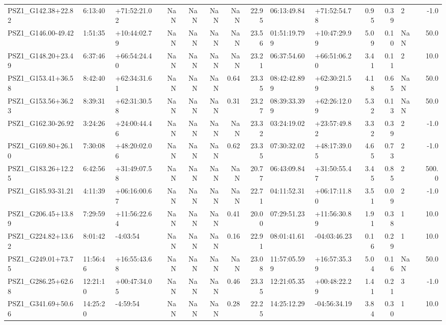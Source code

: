 \documentclass[apj, revtex4]{emulateapj}
\begin{document}
\begin{table}
\begin{tabular}{lllrrrrrllrrlr}
 PSZ1\_G142.38+22.82 &   6:13:40 &  +71:52:21.02 & NaN &  NaN &   NaN & NaN &    22.95 &   06:13:49.84 &  +71:52:54.78 &     0.95 &  0.39 &    2 &  -1.0 \\
 PSZ1\_G146.00-49.42 &   1:51:35 &  +10:44:02.79 & NaN &  NaN &   NaN & NaN &    23.56 &  01:51:19.799 &  +10:47:29.99 &     5.09 &  0.10 &  NaN &  50.0 \\
 PSZ1\_G148.20+23.49 &   6:37:46 &  +66:54:24.40 & NaN &  NaN &   NaN &  NaN &    23.21 &   06:37:54.60 &  +66:51:06.20 &     3.41 &  0.11 &    2 &  10.0 \\
 PSZ1\_G153.41+36.58 &   8:42:40 &  +62:34:31.61 & NaN &  NaN &   NaN & 0.64 &    23.35 &  08:42:42.899 &  +62:30:21.59 &     4.18 &  0.65 &  NaN &  50.0 \\
 PSZ1\_G153.56+36.23 &   8:39:31 &  +62:31:30.58 & NaN &  NaN &   NaN & 0.31 &    23.27 &  08:39:33.399 &  +62:26:12.09 &     5.32 &  0.13 &  NaN &  50.0 \\
 PSZ1\_G162.30-26.92 &   3:24:26 &  +24:00:44.46 & NaN &  NaN &   NaN & NaN &    23.32 &   03:24:19.02 &  +23:57:49.82 &     3.32 &  0.39 &    2 &  -1.0 \\
 PSZ1\_G169.80+26.10 &   7:30:08 &  +48:20:02.06 & NaN &  NaN &   NaN & 0.62 &    23.35 &   07:30:32.02 &  +48:17:39.05 &     4.65 &  0.73 &    2 &  -1.0 \\
 PSZ1\_G183.26+12.25 &   6:42:56 &  +31:49:07.58 & NaN &  NaN &   NaN & NaN &    20.77 &   06:43:09.84 &  +31:50:55.47 &     3.45 &  0.85 &    2 & 500.0 \\
 PSZ1\_G185.93-31.21 &   4:11:39 &  +06:16:00.67 & NaN &  NaN &   NaN & NaN &    22.71 &   04:11:52.31 &  +06:17:11.80 &     3.51 &  0.09 &    2 &  -1.0 \\
 PSZ1\_G206.45+13.89 &   7:29:59 &  +11:56:22.64 & NaN &  NaN &   NaN & 0.41 &    20.00 &   07:29:51.23 &  +11:56:30.89 &     1.91 &  0.38 &    1 &  10.0 \\
 PSZ1\_G224.82+13.62 &   8:01:42 &      -4:03:54 & NaN &  NaN &   NaN & 0.16 &    22.91 &   08:01:41.61 &  -04:03:46.23 &     0.16 &  0.29 &    1 &  10.0 \\
 PSZ1\_G249.01+73.75 &  11:56:46 &  +16:55:43.68 & NaN &  NaN &   NaN & NaN &    23.08 &  11:57:05.599 &  +16:57:35.39 &     5.04 &  0.16 &  NaN &  50.0 \\
 PSZ1\_G286.25+62.68 &  12:21:10 &  +00:47:34.05 & NaN &  NaN &   NaN & 0.46 &    23.35 &   12:21:05.35 &  +00:48:22.29 &     1.41 &  0.21 &    3 &  -1.0 \\
 PSZ1\_G341.69+50.66 &  14:25:20 &      -4:59:54 & NaN &  NaN &   NaN & 0.28 &    22.25 &   14:25:12.29 &  -04:56:34.19 &     3.84 &  0.30 &    1 &  10.0 \\

\end{tabular}
\end{table}
\end{document}
